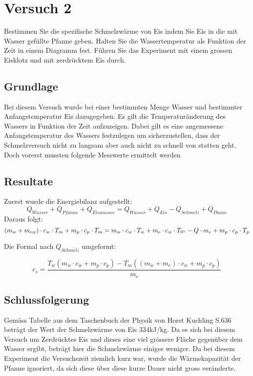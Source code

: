 \documentclass{article}
\begin{document}
\section{Versuch 2}
Bestimmen Sie die spezifische Schmelzwärme von Eis indem Sie Eis in die mit Wasser gefüllte Pfanne geben.
Halten Sie die Wassertemperatur als Funktion der Zeit in einem Diagramm fest. Führen Sie das Experiment
mit einem grossen Eisklotz und mit zerdrücktem Eis durch.
\subsection{Grundlage}
Bei diesem Versuch wurde bei einer bestimmten Menge Wasser und bestimmter Anfangstemperatur 
Eis dazugegeben. Es gilt die Temperaturänderung des Wassers in Funktion der Zeit aufzuzeigen. 
Dabei gilt es eine angemessene Anfangstemperatur des Wassers festzulegen um sicherzustellen, dass 
der Schmelzversuch nicht zu langsam aber auch nicht zu schnell von statten geht. Doch vorerst 
mussten folgende Messwerte ermittelt werden
\subsection{Resultate}
Zuerst wurde die Energiebilanz aufgestellt:
\begin{equation}
Q_{Wasser}+Q_{Pfanne}+Q_{Eiswasser} = Q_{Wasser}+Q_{Eis}-Q_{Schmelz}+Q_{Panne}
\end{equation}
Daraus folgt:
\begin{equation}
(m_{w}+m_{ew})\cdot c_{w}\cdot T_m+m_{p}\cdot c_{p}\cdot T_m= \\ m_{w} \cdot c_{w} \cdot T_{w}+ m_{e} \cdot c_{w} \cdot T_{0^\circ}-Q \cdot m_{e}+m_{p} \cdot c_{p} \cdot
 T_{p}
\end{equation}

Die Formal nach $Q_{Schmelz}$ umgeformt:

\begin{equation}
c_{s} = \frac{T_{w}(m_{w} \cdot c_{w}+m_{p} \cdot c_{p})-T_{m}((m_{w}+m_{e}) \cdot c_{w}+m_{p} \cdot c_{p})}{m_{e}}
\end{equation}

\subsection{Schlussfolgerung}
Gemäss Tabelle aus dem Taschenbuch der Physik von Horst Kuchling S.636 beträgt der Wert der 
Schmelzwärme von Eis 334kJ/kg.  
Da es sich bei diesem Versuch um Zerdrücktes Eis und dieses eine viel grössere Fläche gegenüber 
dem Wasser ergibt, beträgt hier die Schmelzwärme einiges weniger. Da bei diesem Experiment die 
Versuchszeit ziemlich kurz war, wurde die Wärmekapazität der Pfanne ignoriert, da sich diese über 
diese kurze Dauer nicht gross veränderte. 
\end{document}
